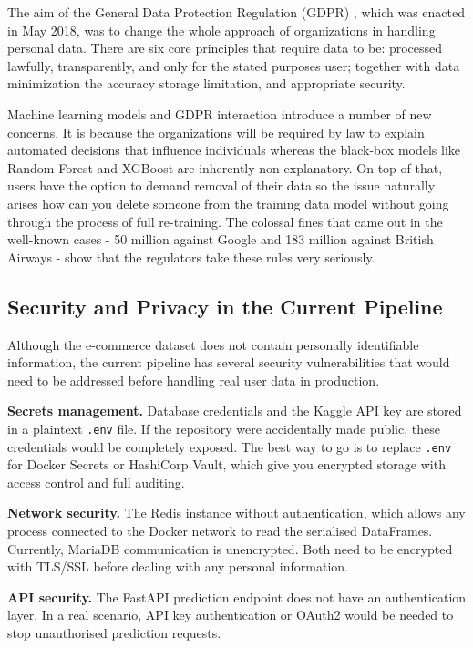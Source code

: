 \documentclass[12pt,a4paper]{article}
\begin{document}
The aim of the General Data Protection Regulation (GDPR) \cite{gdpr2016}, which was enacted in May 2018, was to change the whole approach of organizations in handling personal data. 
There are six core principles that require data to be: processed lawfully, transparently, and only for the stated purposes user; together with data minimization the accuracy storage limitation, and appropriate security. 

Machine learning models and GDPR interaction introduce a number of new concerns. It is because the organizations will be required by law to explain automated decisions that influence individuals whereas the black-box models like Random Forest and XGBoost are inherently non-explanatory.
On top of that, users have the option to demand removal of their data so the issue naturally arises how can you delete someone from the training data model without going through the process of full re-training. The colossal fines that came out in the well-known cases - 50 million against Google and 183 million against British Airways - show that the regulators take these rules very seriously. 


\subsection{Security and Privacy in the Current Pipeline}

Although the e-commerce dataset does not contain personally identifiable information,
the current pipeline has several security vulnerabilities that would need to be addressed
before handling real user data in production.

\textbf{Secrets management.} Database credentials and the Kaggle API key are stored in
a plaintext \texttt{.env} file. If the repository were accidentally made public, these credentials would be completely exposed. The best way to go is to replace \texttt{.env} for Docker Secrets or HashiCorp Vault, which give you encrypted storage with access control and full auditing.

\textbf{Network security.} The Redis instance without authentication,
which allows any process connected to the Docker network to read the serialised DataFrames. Currently, MariaDB communication is unencrypted. Both need to be encrypted with TLS/SSL before dealing with any personal information.

\textbf{API security.} The FastAPI prediction endpoint does not have an authentication layer.
In a real scenario, API key authentication or OAuth2 would be needed to
stop unauthorised prediction requests.
\end{document}
